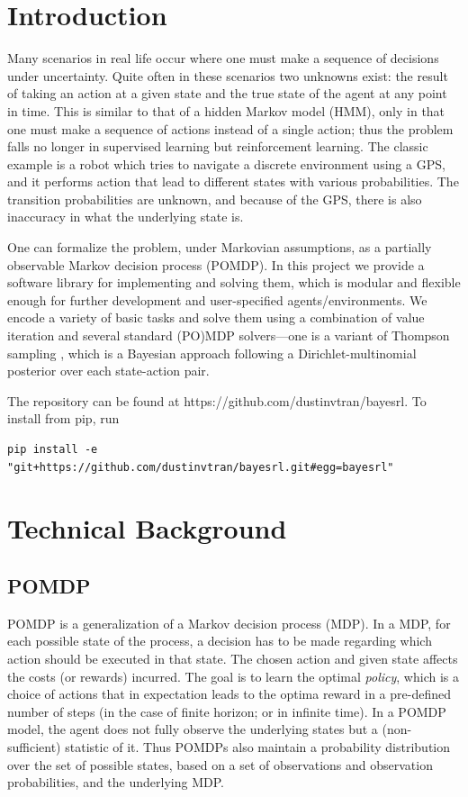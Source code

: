\documentclass{pset}
\begin{document}

\section{Introduction}
Many scenarios in real life occur where one must make a sequence of decisions
under uncertainty. Quite often in these scenarios two unknowns exist: the
result of taking an action at a given state and the true state of the agent at
any point in time. This is similar to that of a hidden Markov model (HMM), only
in that one must make a sequence of actions instead of a single action; thus the
problem falls no longer in supervised learning but reinforcement learning. The
classic example is a robot which tries to navigate a discrete environment using a
GPS, and it performs action that lead to different states with various
probabilities. The transition probabilities are unknown, and because of the GPS,
there is also inaccuracy in what the
underlying state is.

One can formalize the problem, under Markovian assumptions, as a partially
observable Markov decision process (POMDP). In this project we provide a
software library for implementing and solving them, which is modular and
flexible enough for further development and user-specified agents/environments.
We encode a variety of basic tasks and solve them using a combination of value
iteration and several standard (PO)MDP solvers---one is a variant of Thompson
sampling \cite{strens2000bayesian}, which is a Bayesian approach following a
Dirichlet-multinomial posterior over each state-action pair.

The repository can be found at https://github.com/dustinvtran/bayesrl.
To install from pip, run
\begin{lstlisting}
pip install -e "git+https://github.com/dustinvtran/bayesrl.git#egg=bayesrl"
\end{lstlisting}

\section{Technical Background}

\subsection{POMDP}
POMDP is a generalization of a Markov decision process (MDP). In a MDP, for each
possible state of the process, a decision has to be made regarding which action
should be executed in that state. The chosen action and given state affects the
costs (or rewards) incurred. The goal is to learn the optimal \emph{policy},
which is a
choice of actions that in expectation leads to the optima reward in a
pre-defined number of steps (in the case of finite horizon; or in infinite time). In a
POMDP model, the agent does not fully observe the underlying states but a
(non-sufficient) statistic of it. Thus POMDPs also
maintain a probability distribution over the set of possible states, based on a
set of observations and observation probabilities, and the underlying MDP.
\end{document}
